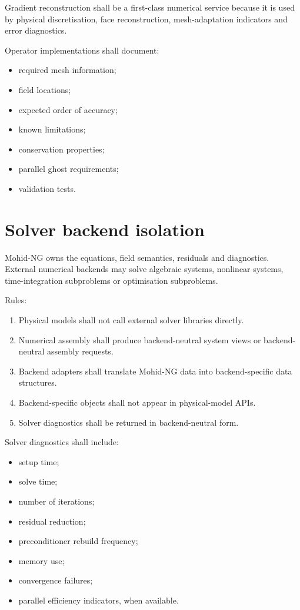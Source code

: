 \documentclass[11pt,a4paper]{article}
\begin{document}
Gradient reconstruction shall be a first-class numerical service because it is used by physical discretisation, face reconstruction, mesh-adaptation indicators and error diagnostics.

Operator implementations shall document:

\begin{itemize}
  \item required mesh information;
  \item field locations;
  \item expected order of accuracy;
  \item known limitations;
  \item conservation properties;
  \item parallel ghost requirements;
  \item validation tests.
\end{itemize}

\section{Solver backend isolation}

Mohid-NG owns the equations, field semantics, residuals and diagnostics. External numerical backends may solve algebraic systems, nonlinear systems, time-integration subproblems or optimisation subproblems.

Rules:

\begin{enumerate}
  \item Physical models shall not call external solver libraries directly.
  \item Numerical assembly shall produce backend-neutral system views or backend-neutral assembly requests.
  \item Backend adapters shall translate Mohid-NG data into backend-specific data structures.
  \item Backend-specific objects shall not appear in physical-model APIs.
  \item Solver diagnostics shall be returned in backend-neutral form.
\end{enumerate}

Solver diagnostics shall include:

\begin{itemize}
  \item setup time;
  \item solve time;
  \item number of iterations;
  \item residual reduction;
  \item preconditioner rebuild frequency;
  \item memory use;
  \item convergence failures;
  \item parallel efficiency indicators, when available.
\end{itemize}
\end{document}
